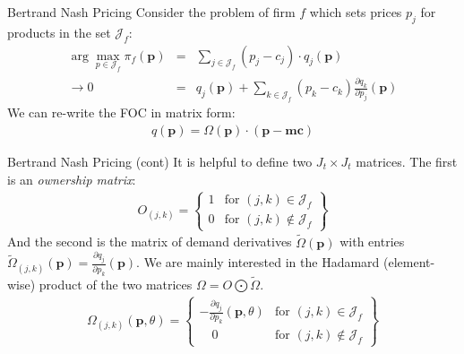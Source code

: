 \documentclass[xcolor=pdftex,dvipsnames,table,mathserif]{beamer}
\begin{document}
\begin{frame}{Bertrand Nash Pricing}
Consider the problem of firm $f$ which sets prices $p_j$ for products in the set $\mathcal{J}_f$:
\begin{eqnarray*}
\arg \max_{p \in \mathcal{J}_f} \pi_f (\mathbf{p}) &=& \sum_{j \in \mathcal{J}_f} (p_j - c_j) \cdot q_j(\mathbf{p}) \\
\rightarrow 0&=& q_j(\mathbf{p}) + \sum_{k \in \mathcal{J}_f} (p_k - c_k) \frac{\partial q_{k}}{\partial p_j}(\mathbf{p})
\end{eqnarray*}
We can re-write the FOC in matrix form:
\begin{eqnarray*}
q(\mathbf{p}) = \Omega(\mathbf{p})\cdot(\mathbf{p}-\mathbf{mc})
\end{eqnarray*}
\end{frame}

\begin{frame}{Bertrand Nash Pricing (cont)}
It is helpful to define two $J_t \times J_t$ matrices. The first is an \textit{ownership matrix}:
\begin{eqnarray*}
O_{(j,k)} = \left\{\begin{array}{lr}
          1 & \text{for }  (j,k) \in \mathcal{J}_f\\
       	  0 & \text{for } (j,k) \notin \mathcal{J}_f
        \end{array} \right\}
\end{eqnarray*}
And the second is the matrix of demand derivatives $\tilde{\Omega}(\mathbf{p})$ with entries $\tilde{\Omega}_{(j,k)}(\mathbf{p})=\frac{\partial q_{j}}{\partial p_k}(\mathbf{p})$. We are mainly interested in the Hadamard (element-wise) product of the two matrices $\Omega = O\bigodot\tilde{\Omega}$.
\begin{eqnarray*}
\Omega_{(j,k)}(\mathbf{p},\theta) = \left\{\begin{array}{lr}
         - \frac{\partial q_{j}}{\partial p_k}(\mathbf{p},\theta) & \text{for }  (j,k) \in \mathcal{J}_f\\
       	  \quad 0 & \text{for } (j,k) \notin \mathcal{J}_f
        \end{array} \right\}
\end{eqnarray*}
\end{frame}
\end{document}
